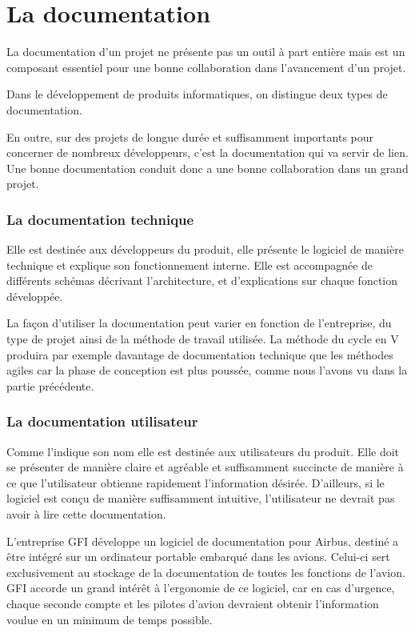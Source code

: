 \section{La documentation}

La documentation d'un projet ne présente pas un outil à part entière mais est un composant essentiel pour une bonne collaboration dans l'avancement d'un projet.

Dans le développement de produits informatiques, on distingue deux types de documentation.

En outre, sur des projets de longue durée et suffisamment importants pour concerner de nombreux développeurs, c'est la documentation qui va servir de lien. Une bonne documentation conduit donc a une bonne collaboration dans un grand projet.

\subsubsection{La documentation technique}

Elle est destinée aux développeurs du produit, elle présente le logiciel de manière technique et explique son fonctionnement interne. Elle est accompagnée de différents schémas décrivant l'architecture, et d'explications sur chaque fonction développée.

La façon d'utiliser la documentation peut varier en fonction de l'entreprise, du type de projet ainsi de la méthode de travail utilisée. La méthode du cycle en V produira par exemple davantage de documentation technique que les méthodes agiles car la phase de conception est plus poussée, comme nous l'avons vu dans la partie précédente.

\subsubsection{La documentation utilisateur}

Comme l'indique son nom elle est destinée aux utilisateurs du produit. Elle doit se présenter de manière claire et agréable et suffisamment succincte de manière à ce que l'utilisateur obtienne rapidement l'information désirée.
D'ailleurs, si le logiciel est conçu de manière suffisamment intuitive, l'utilisateur ne devrait pas avoir à lire cette documentation.

\begin{app}
L'entreprise GFI développe un logiciel de documentation pour Airbus, destiné a être intégré sur un ordinateur portable embarqué dans les avions. Celui-ci sert exclusivement au stockage de la documentation de toutes les fonctions de l'avion. GFI accorde un grand intérêt à l'ergonomie de ce logiciel, car en cas d'urgence, chaque seconde compte et les pilotes d'avion devraient obtenir l'information voulue en un minimum de temps possible.
\end{app}

